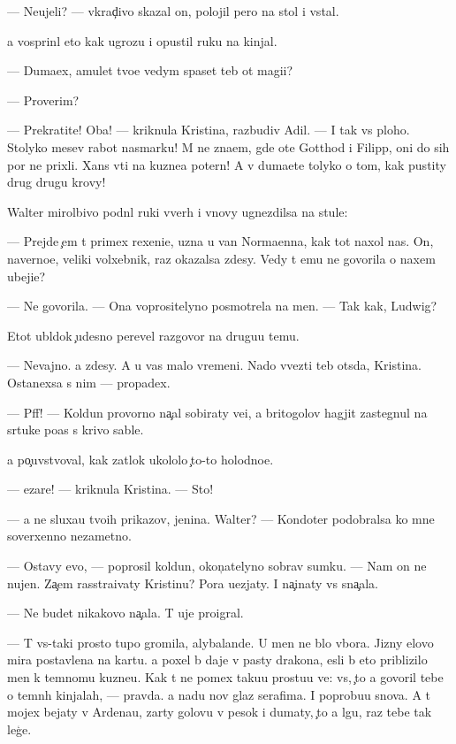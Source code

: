 \documentclass[10pt]{book}
\begin{document}
— Neujeli? — vkrad{\c}ivo skazal on, polojil pero na stol i vstal.

{\Y}a vosprin{\ia}l eto kak ugrozu i opustil ruku na kinjal.

— Duma{\y}ex, amulet tvo{\y}e{\y} vedym{\yi} spaset teb{\ia} ot magi{\y}i?

— Proverim?

— Prekratite! Oba! — kriknula Kristina, razbudiv Adil{\ia}. — I tak vs{\e} ploho. Stolyko mes{\ia}{\q}ev rabot{\yi} nasmarku! M{\yi} ne zna{\y}em, gde ote{\q} Gotthod i Filipp, oni do sih por ne prixli. Xans v{\yi}{\y}ti na kuzne{\q}a poter{\ia}n! A v{\yi} duma{\y}ete tolyko o tom, kak pustity drug drugu krovy!

Walter mirol{\iu}bivo podn{\ia}l ruki vverh i vnovy ugnezdilsa na stule:

— Prejde {\c}em t{\yi} primex rexeni{\y}e, uzna{\y} u van Norma{\y}enna, kak tot naxol nas. On, naverno{\y}e, veliki{\y} volxebnik, raz okazalsa zdesy. Vedy t{\yi} {\y}emu ne govorila o naxem ubeji{\x}e?

— Ne govorila. — Ona voprositelyno posmotrela na men{\ia}. — Tak kak, Ludwig?

Etot ubl{\iu}dok {\c}udesno perevel razgovor na drugu{\y}u temu.

— Nevajno. {\Y}a zdesy. A u vas malo vremeni. Nado v{\yi}vezti teb{\ia} ots{\iu}da, Kristina. Ostanexsa s nim — propadex.

— Pff! — Koldun provorno na{\c}al sobiraty ve{\x}i, a britogolov{\yi}{\y} hagjit zastegnul na s{\iu}rtuke po{\y}as s krivo{\y} sable{\y}.

{\Y}a po{\c}uvstvoval, kak zat{\yi}lok ukololo {\c}to-to holodno{\y}e.

— {\C}ezare! — kriknula Kristina. — Sto{\y}!

— {\Y}a ne sluxa{\y}u tvo{\y}ih prikazov, jen{\x}ina. Walter? — Kondot{\y}er podobralsa ko mne soverxenno nezametno.

— Ostavy {\y}evo, — poprosil koldun, okon{\c}atelyno sobrav sumku. — Nam on ne nujen. Za{\c}em rasstra{\y}ivaty Kristinu? Pora u{\y}ezjaty. I na{\c}inaty vs{\e} sna{\c}ala.

— Ne budet nikakovo na{\c}ala. T{\yi} uje proigral.

— T{\yi} vs{\e}-taki prosto tupo{\y} gromila, alybalande{\q}. U men{\ia} ne b{\yi}lo v{\yi}bora. Jizny {\q}elovo mira postavlena na kartu. {\Y}a poxel b{\yi} daje v pasty drakona, {\y}esli b{\yi} eto priblizilo men{\ia} k temnomu kuzne{\q}u. Kak t{\yi} ne po{\y}mex taku{\y}u prostu{\y}u ve{\x}: vs{\e}, {\c}to {\y}a govoril tebe o temn{\yi}h kinjalah, — pravda. {\Y}a na{\y}du nov{\yi}{\y} glaz serafima. I poprobu{\y}u snova. A t{\yi} mojex bejaty v Ardenau, zar{\yi}ty golovu v pesok i dumaty, {\c}to {\y}a lgu, raz tebe tak leg{\c}e.
\end{document}
